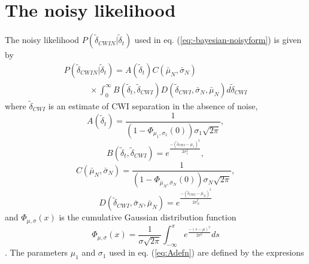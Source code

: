 \documentclass[extra]{gji}
\begin{document}





\appendix

\section{The noisy likelihood}
\label{sec-Appendix-noisylikelihood}

The noisy likelihood $P(\widetilde{\delta}_{CWIN}|\widetilde{\delta}_t)$
used in eq. (\ref{eq:-bayesian-noisyform}) is given by
\begin{equation}
\begin{array}{l}
\label{eq-likelihood-int}
P(\widetilde{\delta}_{CWIN}|\widetilde{\delta}_t)  =
A(\widetilde{\delta}_t) C(\bar{\mu}_N, \bar{\sigma}_N)  \\
\hspace{3em} \times \int_0^\infty
B(\widetilde{\delta}_t,\widetilde{\delta}_{CWI})
D(\widetilde{\delta}_{CWI},\bar{\sigma}_N,\bar{\mu}_N )
d\widetilde{\delta}_{CWI}
\end{array}
\end{equation}
where $\widetilde{\delta}_{CWI}$ is an estimate of CWI separation in the absence
of noise,
\begin{equation}
\label{eq:Adefn}
A(\widetilde{\delta}_t) = \frac{1}{(1-\Phi_{\mu_1,\sigma_1}(0))\sigma_1\sqrt{2\pi} },
\end{equation}
\begin{equation}
B(\widetilde{\delta}_t,\widetilde{\delta}_{CWI})=e^{  \frac{-(\widetilde{\delta}_{CWI}-\mu_1)^2}{2\sigma_1^2} },
\end{equation}
\begin{equation}
\label{eq:Cdefn}
C(\bar{\mu}_N, \bar{\sigma}_N) =  \frac{1}{(1-\Phi_{\bar{\mu}_N,\bar{\sigma}_N}(0))\sigma_N\sqrt{2\pi}},
\end{equation}
\begin{equation}
D(\widetilde{\delta}_{CWI},\bar{\sigma}_N,\bar{\mu}_N )=e^{  \frac{-(\widetilde{\delta}_{CWI}-\bar{\mu}_N)^2}{2 \bar{\sigma}_N ^2} }
\end{equation}
and $\Phi_{\mu,\sigma}(x)$ is the cumulative Gaussian distribution function
\begin{equation}
\label{eq-cummulative-Gaussian}
\Phi_{\mu,\sigma}(x) = \frac{1}{\sigma \sqrt{2 \pi}}
\int_{-\infty}^x e^{  \frac{-(s-\mu)^2}{2\sigma^2}  } ds
\end{equation}
\citep{dr_Robinson11a}. The parameters $\mu_1$ and $\sigma_1$ used
in eq. (\ref{eq:Adefn}) are defined by the expresions
\end{document}
